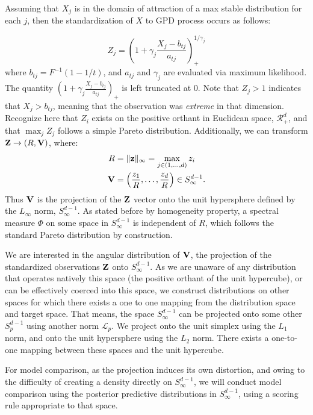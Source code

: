 
Assuming that $X_j$ is in the domain of attraction of a max stable distribution for each $j$, then
  the standardization of $X$ to GPD process occurs as follows:

\begin{equation}
Z_{j} = \left(1 + \gamma_j\frac{X_{j} - b_{tj}}{a_{tj}}\right)_{+}^{1/\gamma_j}
\end{equation}
where $b_{tj} = F^{-1}(1-1/t)$, and $a_{tj}$ and $\gamma_{j}$ are evaluated via maximum likelihood.
  The quantity $\left(1 + \gamma_j\frac{X_{j} - b_{tj}}{a_{tj}}\right)_+$ is left truncated at 0.
  Note that $Z_j > 1$ indicates that $X_{j} > b_{tj}$, meaning that the observation was
  \emph{extreme} in that dimension.  Recognize here that $Z_i$ exists on the positive orthant in
  Euclidean space, $\mathcal{R}_+^d$, and that $\max_jZ_j$ follows a simple Pareto distribution.
  Additionally, we can transform ${\bf Z} \rightarrow (R, {\bf V})$, where:
\begin{equation}
  \begin{aligned}
    R &= \lVert {\bf z} \rVert_{\infty} = \max_{j \in (1,\ldots,d)} z_i\\
    {\bf V} &= \left(\frac{z_1}{R},\ldots,\frac{z_d}{R}\right) \in S_{\infty}^{d-1}.\\
  \end{aligned}
\end{equation}
  Thus ${\bf V}$ is the projection of the ${\bf Z}$ vector onto the unit hypersphere defined by
  the $L_{\infty}$ norm, $S_{\infty}^{d-1}$.  As stated before by homogeneity property, a spectral
  measure $\Phi$ on some space in $S_{\infty}^{d-1}$ is independent of $R$, which follows the
  standard Pareto distribution by construction.

We are interested in the angular distribution of ${\bf V}$, the projection of the standardized
  observations ${\bf Z}$ onto $S_{\infty}^{d-1}$.  As we are unaware of any distribution that
  operates natively this space (the positive orthant of the unit hypercube), or can be effectively
  coerced into this space, we construct distributions on other spaces for which there exists a
  one to one mapping from the distribution space and target space.  That means, the space
  $S_{\infty}^{d-1}$ can be projected onto some other $S_p^{d-1}$ using another norm $\mathcal{L}_p$.
  We project onto the unit simplex using the $L_1$ norm, and onto the unit hypersphere using the
  $L_2$ norm.  There exists a one-to-one mapping between these spaces and the unit hypercube.

For model comparison, as the projection induces its own distortion, and owing to the difficulty of
  creating a density directly on $S_{\infty}^{d-1}$, we will conduct model comparison using the
  posterior predictive distributions in $S_{\infty}^{d-1}$, using a scoring rule appropriate
  to that space.

